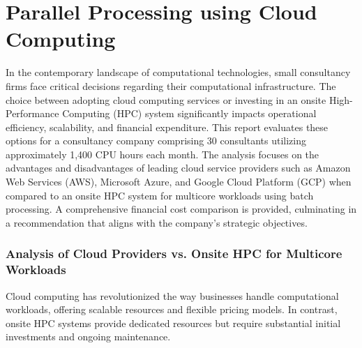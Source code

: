 \documentclass{article}
\begin{document}
\begin{cwauthorlist}
\end{cwauthorlist}

\part{Parallel Processing using Cloud Computing}

In the contemporary landscape of computational technologies, small consultancy firms face critical decisions regarding their computational infrastructure. The choice between adopting cloud computing services or investing in an onsite High-Performance Computing (HPC) system significantly impacts operational efficiency, scalability, and financial expenditure. This report evaluates these options for a consultancy company comprising 30 consultants utilizing approximately 1,400 CPU hours each month. The analysis focuses on the advantages and disadvantages of leading cloud service providers such as Amazon Web Services (AWS), Microsoft Azure, and Google Cloud Platform (GCP) when compared to an onsite HPC system for multicore workloads using batch processing. A comprehensive financial cost comparison is provided, culminating in a recommendation that aligns with the company's strategic objectives.

\section{Analysis of Cloud Providers vs. Onsite HPC for Multicore Workloads}

Cloud computing has revolutionized the way businesses handle computational workloads, offering scalable resources and flexible pricing models. In contrast, onsite HPC systems provide dedicated resources but require substantial initial investments and ongoing maintenance.
\end{document}
